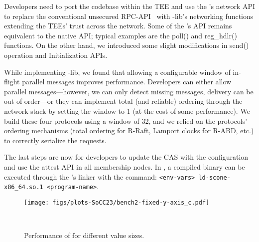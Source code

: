 Developers need to port the codebase within the TEE and use the \projecttitle{}'s network API to replace the conventional unsecured RPC-API~\cite{rdma, erpc, f04eb9b864204bab958e72055062748c} with \projecttitle{}-lib's networking functions extending the TEEs' trust across the network. Some of the \projecttitle{}'s API remains equivalent to the native API; typical examples are the poll() and reg\_hdlr() functions. On the other hand, we introduced some slight modifications in send() operation and Initialization APIs.  %




While implementing \projecttitle{}-lib, we found that allowing a configurable window of in-flight parallel messages improves performance. Developers can either allow parallel messages---however, we can only detect missing messages, delivery can be out of order---or they can implement total (and reliable) ordering through the network stack by setting the window to 1 (at the cost of some performance). We build these four protocols using a window of 32, and we relied on the protocols' ordering mechanisms (total ordering for R-Raft, Lamport clocks for R-ABD, etc.) to correctly serialize the requests.

The last steps are now for developers to update the CAS with the configuration and use the attest API in all membership nodes. In \scone{}, a compiled binary can be executed through the \scone{}'s linker with the command: \texttt{<env-vars> ld-scone-x86\_64.so.1 <program-name>}.
\fi 

\begin{figure}
    \centering
     \texttt{[image: figs/plots-SoCC23/bench2-fixed-y-axis\_c.pdf]}

    \caption{Performance of \projecttitle{} for different value sizes.}
    \vspace{0pt}
    ~\label{fig:value_sz}
\end{figure}

